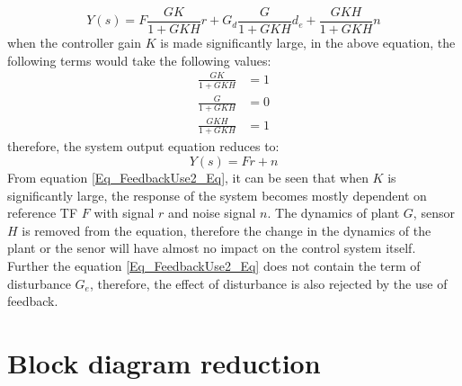\begin{equation}
	Y(s) = F \frac{GK}{1 + GKH} r + G_d \frac{G}{1 + GKH} d_e + \frac{GKH}{1 + GKH}n
\end{equation}
when the controller gain $K$ is made significantly large, in the above equation, the following terms would take the following values:
\begin{align*}
	\frac{GK}{1 + GKH} &= 1 \\
	\frac{G}{1 + GKH} &= 0 \\
	\frac{GKH}{1 + GKH} &= 1
\end{align*}
therefore, the system output equation reduces to:
\begin{equation} \label{Eq_FeedbackUse2_Eq}
	Y(s) = F r + n
\end{equation}
From equation \eqref{Eq_FeedbackUse2_Eq}, it can be seen that when $K$ is significantly large, the response of the system becomes mostly dependent on reference TF $F$ with signal $r$ and noise signal $n$. The dynamics of plant $G$, sensor $H$ is removed from the equation, therefore the change in the dynamics of the plant or the senor will have almost no impact on the control system itself. Further the equation \eqref{Eq_FeedbackUse2_Eq} does not contain the term of disturbance $G_e$, therefore, the effect of disturbance is also rejected by the use of feedback.

\section{Block diagram reduction} \label{Sec_BlockDiagReduction}

